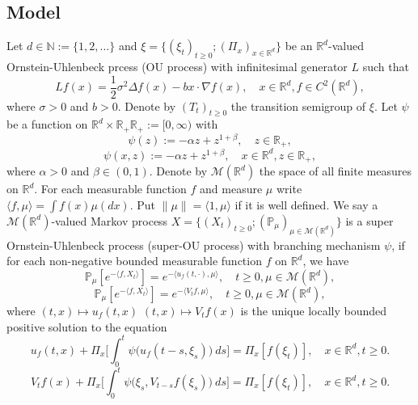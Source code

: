 \documentclass[12pt,oneside,english]{amsart}
\theoremstyle{plain}
\theoremstyle{definition}
\numberwithin{equation}{section}
\newcommand{\added}[1]{{\color{blue}#1}}\newcommand{\deleted}[1]{{\color{red}#1}}
\begin{document}
\subsection{Model}
    Let $d \in \mathbb N:= \{1,2,\dots\}$ and
    $\xi=\{(\xi_t)_{t\geq 0}; (\Pi_x)_{x\in \mathbb R^d}\}$ be an $\mathbb R^d$-valued Ornstein-Uhlenbeck prcess (OU process) with infinitesimal generator $L$ such that
\begin{equation}
\label{eq: OU generator}
    Lf(x)
        = \frac{1}{2}\sigma^2\Delta f(x)-b x \cdot \nabla f(x),
        \quad  x\in \mathbb R^d,
        f \in C^2(\mathbb{R}^d),
\end{equation}
    where $\sigma>0$ and $b>0$.
    Denote by $(T_t)_{t\geq 0}$ the transition semigroup of $\xi$.
    Let $\psi$ be a function on \added{$\mathbb R^d \times \mathbb R_+$}\deleted{$\mathbb R_+:= [0,\infty)$} with
\deleted{
\begin{equation}\label{mechanism}
    \psi(z)
    := - \alpha z + z^{1+\beta},
    \quad z \in \mathbb R_+,
\end{equation}
}
\added{
\begin{equation}\label{mechanism}
    \psi(x, z)
    := - \alpha z + z^{1+\beta},
    \quad x\in \mathbb R^d, z \in \mathbb R_+,
\end{equation}
}
        where $\alpha > 0$ and $\beta \in (0,1) $.
    Denote by $\mathcal{M}(\mathbb{R}^d)$ the space of all finite measures on $\mathbb{R}^d$.
    For each measurable function $f$ and measure $\mu$ write $\langle f,\mu\rangle = \int f(x)\mu(dx)$.
    Put $\|\mu\|=\langle 1,\mu\rangle$ \added{if it is well defined}.
    We say a $\mathcal{M}(\mathbb{R}^d)$-valued Markov process $X = \{(X_t)_{t\geq 0}; (\mathbb{P}_{\mu})_{\mu \in \mathcal M(\mathbb R^d)}\}$ is a super Ornstein-Uhlenbeck process (super-OU process) with branching mechanism $\psi$, if for each non-negative bounded measurable function $f$ on $\mathbb{R}^d$, we have
\deleted{
\begin{equation} \label{super}
    \mathbb{P}_{\mu}[e^{-\langle f,X_t \rangle}]
        = e^{-\langle u_f(t,\cdot), \mu \rangle},
        \quad t\geq 0, \mu \in \mathcal M(\mathbb R^d),
\end{equation}
}
\added{
\begin{equation} \label{super}
    \mathbb{P}_{\mu}[e^{-\langle f,X_t \rangle}]
    = e^{-\langle V_tf, \mu \rangle},
    \quad t\geq 0, \mu \in \mathcal M(\mathbb R^d),
\end{equation}
}
    where \deleted{$(t,x) \mapsto u_f(t,x)$} \added{$(t,x) \mapsto V_tf(x)$} is the unique locally bounded positive solution to the equation
\deleted{
\begin{equation}\label{eq1}
	u_f(t,x) + \Pi_x \Big[ \int_0^t\psi\big(u_f(t-s, \xi_s)\big)~ds\Big]
	= \Pi_x [f(\xi_t)],
	\quad x\in \mathbb R^d, t\geq 0.
\end{equation}
}
\added{
\begin{equation}\label{eq1}
	V_tf(x) + \Pi_x \Big[ \int_0^t\psi\big(\xi_s,V_{t-s}f(\xi_s)\big)~ds\Big]
	= \Pi_x [f(\xi_t)],
    \quad x\in \mathbb R^d, t\geq 0.
\end{equation}	
}
\end{document}
